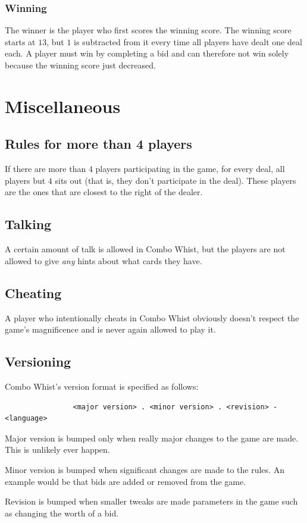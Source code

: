 \documentclass[a4paper]{article}
\begin{document}
{{			\subsubsection{Winning}{%
				The winner is the player who first scores the winning score. The winning score starts at $13$, but $1$ is subtracted from it every time all players have dealt one deal each. A player must win by completing a bid and can therefore not win solely because the winning score just decreased.
			}
		}
	}

	\section{Miscellaneous}{%
		\subsection{Rules for more than 4 players}{%
			If there are more than $4$ players participating in the game, for every deal, all players but $4$ sits out (that is, they don't participate in the deal). These players are the ones that are closest to the right of the dealer.
			
			
		}
		
		\subsection{Talking}{%
			A certain amount of talk is allowed in Combo Whist, but the players are not allowed to give \emph{any} hints about what cards they have.
		}
		
		\subsection{Cheating}{%
			A player who intentionally cheats in Combo Whist obviously doesn't respect the game's magnificence and is never again allowed to play it.
		}

		\subsection{Versioning}{%
			Combo Whist's version format is specified as follows:
			\begin{verbatim}
				<major version> . <minor version> . <revision> - <language>
			\end{verbatim}

			Major version is bumped only when really major changes to the game are made. This is unlikely ever happen.

			Minor version is bumped when significant changes are made to the rules. An example would be that bids are added or removed from the game.

			Revision is bumped when smaller tweaks are made parameters in the game such as changing the worth of a bid.
		}
	}

	\pagebreak
	
	
\end{document}
